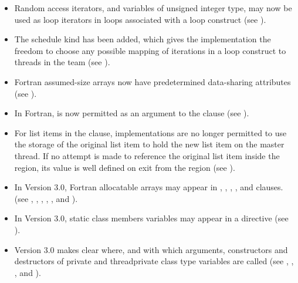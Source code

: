 \begin{itemize}
\item Random access iterators, and variables of unsigned integer type, may now be used as
loop iterators in loops associated with a loop construct (see
).

\item The schedule kind  has been added, which gives the implementation the
freedom to choose any possible mapping of iterations in a loop construct to threads in
the team (see ).

\item Fortran assumed-size arrays now have predetermined data-sharing attributes (see
).

\item In Fortran,  is now permitted as an argument to the 
clause (see
).

\item For list items in the  clause, implementations are no longer permitted to use
the storage of the original list item to hold the new list item on the master thread. If
no attempt is made to reference the original list item inside the  region, its
value is well defined on exit from the  region (see
).

\item In Version 3.0, Fortran allocatable arrays may appear in ,
, , ,  and 
clauses. (see
,
,
,
,
,
 and
).

\item In Version 3.0, static class members variables may appear in a 
directive (see
).

\item Version 3.0 makes clear where, and with which arguments, constructors and
destructors of private and threadprivate class type variables are called (see
,
,
,
 and
).


\end{itemize}
